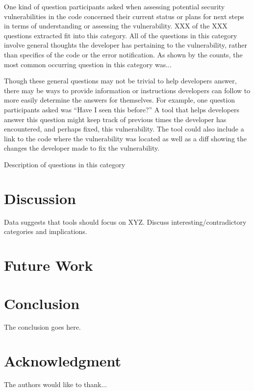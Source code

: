 \documentclass[conference]{IEEEtran}
\begin{document}
One kind of question participants asked when assessing potential security vulnerabilities in the code concerned their current status or plans for next steps in terms of understanding or assessing the vulnerability. XXX of the XXX questions extracted fit into this category. All of the questions in this category involve general thoughts the developer has pertaining to the vulnerability, rather than specifics of the code or the error notification.  As shown by the counts, the most common occurring question in this category was...

Though these general questions may not be trivial to help developers answer, there may be ways to provide information or instructions developers can follow to more easily determine the answers for themselves. For example, one question participants asked was ``Have I seen this before?'' A tool that helps developers answer this question might keep track of previous times the developer has encountered, and perhaps fixed, this vulnerability. The tool could also include a link to the code where the vulnerability was located as well as a diff showing the changes the developer made to fix the vulnerability.


Description of questions in this category

\section{Discussion}
\label{sec:disc}
Data suggests that tools should focus on XYZ. Discuss interesting/contradictory categories and implications.

\section{Future Work}
\label{sec:fw}

\section{Conclusion}
\label{sec:concl}
The conclusion goes here.






\section*{Acknowledgment}


The authors would like to thank...




%




\end{document}
